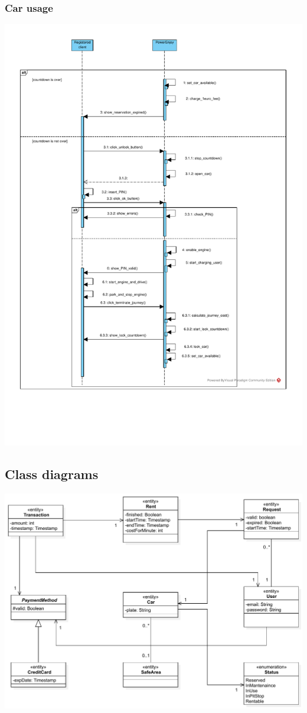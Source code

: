 \subsubsection{Car usage}
\includegraphics[width=\textwidth, keepaspectratio]{../images/diagram/sequence/car_usage.pdf}


\subsection{Class diagrams}

\includegraphics[width=\textwidth, keepaspectratio]{../images/diagram/class/class_diagram.pdf}

